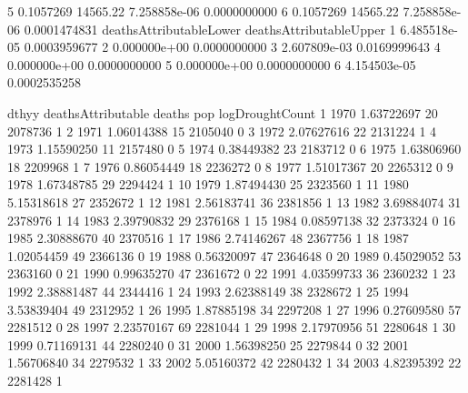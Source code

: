 \documentclass[a4paper]{article}                %
\begin{document}
\begin{Schunk}
\begin{Soutput}
5        0.1057269 14565.22 7.258858e-06       0.0000000000
6        0.1057269 14565.22 7.258858e-06       0.0001474831
  deathsAttributableLower deathsAttributableUpper
1            6.485518e-05            0.0003959677
2            0.000000e+00            0.0000000000
3            2.607809e-03            0.0169999643
4            0.000000e+00            0.0000000000
5            0.000000e+00            0.0000000000
6            4.154503e-05            0.0002535258
\end{Soutput}
\begin{Soutput}
   dthyy deathsAttributable deaths     pop logDroughtCount
1   1970         1.63722697     20 2078736               1
2   1971         1.06014388     15 2105040               0
3   1972         2.07627616     22 2131224               1
4   1973         1.15590250     11 2157480               0
5   1974         0.38449382     23 2183712               0
6   1975         1.63806960     18 2209968               1
7   1976         0.86054449     18 2236272               0
8   1977         1.51017367     20 2265312               0
9   1978         1.67348785     29 2294424               1
10  1979         1.87494430     25 2323560               1
11  1980         5.15318618     27 2352672               1
12  1981         2.56183741     36 2381856               1
13  1982         3.69884074     31 2378976               1
14  1983         2.39790832     29 2376168               1
15  1984         0.08597138     32 2373324               0
16  1985         2.30888670     40 2370516               1
17  1986         2.74146267     48 2367756               1
18  1987         1.02054459     49 2366136               0
19  1988         0.56320097     47 2364648               0
20  1989         0.45029052     53 2363160               0
21  1990         0.99635270     47 2361672               0
22  1991         4.03599733     36 2360232               1
23  1992         2.38881487     44 2344416               1
24  1993         2.62388149     38 2328672               1
25  1994         3.53839404     49 2312952               1
26  1995         1.87885198     34 2297208               1
27  1996         0.27609580     57 2281512               0
28  1997         2.23570167     69 2281044               1
29  1998         2.17970956     51 2280648               1
30  1999         0.71169131     44 2280240               0
31  2000         1.56398250     25 2279844               0
32  2001         1.56706840     34 2279532               1
33  2002         5.05160372     42 2280432               1
34  2003         4.82395392     22 2281428               1

\end{Soutput}
\end{Schunk}
\end{document}
